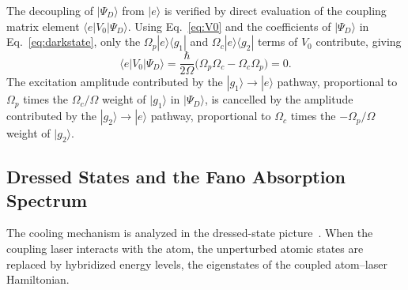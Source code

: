 The decoupling of $|\Psi_D\rangle$ from $|e\rangle$ is verified by direct evaluation of the coupling matrix element $\langle e|V_0|\Psi_D\rangle$. Using Eq.~\eqref{eq:V0} and the coefficients of $|\Psi_D\rangle$ in Eq.~\eqref{eq:darkstate}, only the $\Omega_p|e\rangle\langle g_1|$ and $\Omega_c|e\rangle\langle g_2|$ terms of $V_0$ contribute, giving
\begin{equation}
    \langle e|V_0|\Psi_D\rangle = \frac{\hbar}{2\Omega}\Big(\Omega_p\Omega_c - \Omega_c\Omega_p\Big) = 0.
\end{equation}
The excitation amplitude contributed by the $|g_1\rangle \to |e\rangle$ pathway, proportional to $\Omega_p$ times the $\Omega_c/\Omega$ weight of $|g_1\rangle$ in $|\Psi_D\rangle$, is cancelled by the amplitude contributed by the $|g_2\rangle \to |e\rangle$ pathway, proportional to $\Omega_c$ times the $-\Omega_p/\Omega$ weight of $|g_2\rangle$.

\subsection[Dressed States and the Fano Absorption Spectrum]{Dressed States and the Fano Absorption  \\ Spectrum}

The cooling mechanism is analyzed in the dressed-state picture~\cite{Morigi:03}. When the coupling laser interacts with the atom, the unperturbed atomic states are replaced by hybridized energy levels, the eigenstates of the coupled atom--laser Hamiltonian.


